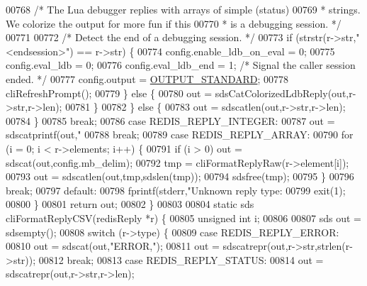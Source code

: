\begin{DoxyCode}
{{{{{{{{{{{{{{{{{{{{{{00768             \textcolor{comment}{/* The Lua debugger replies with arrays of simple (status)}
00769 \textcolor{comment}{             * strings. We colorize the output for more fun if this}
00770 \textcolor{comment}{             * is a debugging session. */}
00771 
00772             \textcolor{comment}{/* Detect the end of a debugging session. */}
00773             \textcolor{keywordflow}{if} (strstr(r->str,\textcolor{stringliteral}{"<endsession>"}) == r->str) \{
00774                 config.enable\_ldb\_on\_eval = 0;
00775                 config.eval\_ldb = 0;
00776                 config.eval\_ldb\_end = 1; \textcolor{comment}{/* Signal the caller session ended. */}
00777                 config.output = \hyperlink{redis-cli_8c_abf624f04f4590979c3c3944bc7f94d6e}{OUTPUT\_STANDARD};
00778                 cliRefreshPrompt();
00779             \} \textcolor{keywordflow}{else} \{
00780                 out = sdsCatColorizedLdbReply(out,r->str,r->len);
00781             \}
00782         \} \textcolor{keywordflow}{else} \{
00783             out = sdscatlen(out,r->str,r->len);
00784         \}
00785         \textcolor{keywordflow}{break};
00786     \textcolor{keywordflow}{case} REDIS\_REPLY\_INTEGER:
00787         out = sdscatprintf(out,\textcolor{stringliteral}{"%
00788         \textcolor{keywordflow}{break};
00789     \textcolor{keywordflow}{case} REDIS\_REPLY\_ARRAY:
00790         \textcolor{keywordflow}{for} (i = 0; i < r->elements; i++) \{
00791             \textcolor{keywordflow}{if} (i > 0) out = sdscat(out,config.mb\_delim);
00792             tmp = cliFormatReplyRaw(r->element[i]);
00793             out = sdscatlen(out,tmp,sdslen(tmp));
00794             sdsfree(tmp);
00795         \}
00796         \textcolor{keywordflow}{break};
00797     \textcolor{keywordflow}{default}:
00798         fprintf(stderr,\textcolor{stringliteral}{"Unknown reply type: %
00799         exit(1);
00800     \}
00801     \textcolor{keywordflow}{return} out;
00802 \}
00803 
00804 \textcolor{keyword}{static} sds cliFormatReplyCSV(redisReply *r) \{
00805     \textcolor{keywordtype}{unsigned} \textcolor{keywordtype}{int} i;
00806 
00807     sds out = sdsempty();
00808     \textcolor{keywordflow}{switch} (r->type) \{
00809     \textcolor{keywordflow}{case} REDIS\_REPLY\_ERROR:
00810         out = sdscat(out,\textcolor{stringliteral}{"ERROR,"});
00811         out = sdscatrepr(out,r->str,strlen(r->str));
00812     \textcolor{keywordflow}{break};
00813     \textcolor{keywordflow}{case} REDIS\_REPLY\_STATUS:
00814         out = sdscatrepr(out,r->str,r->len);
}}}}}}}}}}}}}}}}}}}}}}}}
\end{DoxyCode}
